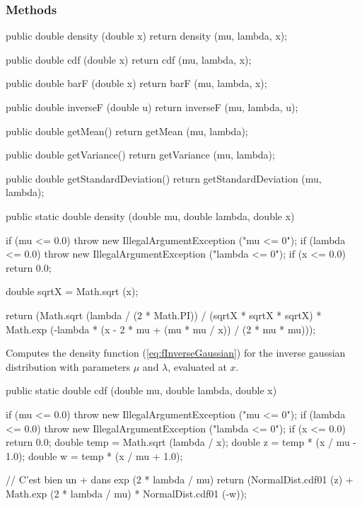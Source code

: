 \subsubsection* {Methods}

\begin{code}\begin{hide}

   public double density (double x) {
      return density (mu, lambda, x);
   }

   public double cdf (double x) {
      return cdf (mu, lambda, x);
   }

   public double barF (double x) {
      return barF (mu, lambda, x);
   }

   public double inverseF (double u) {
      return inverseF (mu, lambda, u);
   }

   public double getMean() {
      return getMean (mu, lambda);
   }

   public double getVariance() {
      return getVariance (mu, lambda);
   }

   public double getStandardDeviation() {
      return getStandardDeviation (mu, lambda);
   }\end{hide}

   public static double density (double mu, double lambda, double x)\begin{hide} {
      if (mu <= 0.0)
         throw new IllegalArgumentException ("mu <= 0");
      if (lambda <= 0.0)
         throw new IllegalArgumentException ("lambda <= 0");
      if (x <= 0.0)
         return 0.0;

      double sqrtX = Math.sqrt (x);

      return (Math.sqrt (lambda / (2 * Math.PI)) / (sqrtX * sqrtX * sqrtX) *
              Math.exp (-lambda * (x - 2 * mu + (mu * mu / x)) / (2 * mu * mu)));
   }\end{hide}
\end{code}
\begin{tabb} Computes the density function (\ref{eq:fInverseGaussian}) for the
     inverse gaussian distribution with parameters $\mu$ and $\lambda$,
     evaluated at $x$.
\end{tabb}
\begin{code}

   public static double cdf (double mu, double lambda, double x)\begin{hide} {
      if (mu <= 0.0)
         throw new IllegalArgumentException ("mu <= 0");
      if (lambda <= 0.0)
         throw new IllegalArgumentException ("lambda <= 0");
      if (x <= 0.0)
         return 0.0;
      double temp = Math.sqrt (lambda / x);
      double z = temp * (x / mu - 1.0);
      double w = temp * (x / mu + 1.0);

      // C'est bien un + dans    exp (2 * lambda / mu)
      return (NormalDist.cdf01 (z) +
              Math.exp (2 * lambda / mu) * NormalDist.cdf01 (-w));
   }\end{hide}
\end{code}
